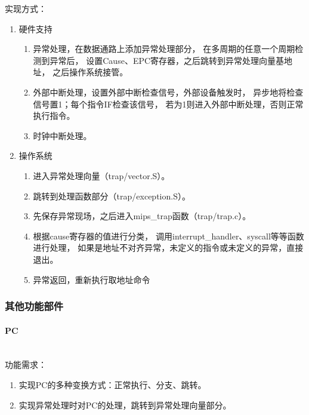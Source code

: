            实现方式：
            \begin{enumerate}
            \item
            硬件支持
                \begin{enumerate}
                \item
                异常处理，在数据通路上添加异常处理部分，%
                在多周期的任意一个周期检测到异常后，%
                设置Cause、EPC寄存器，之后跳转到异常处理向量基地址，%
                之后操作系统接管。
                \item
                外部中断处理，设置外部中断检查信号，外部设备触发时，%
                异步地将检查信号置1；每个指令IF检查该信号，%
                若为1则进入外部中断处理，否则正常执行指令。
                \item
                时钟中断处理。
                \end{enumerate}
            \item
            操作系统
                \begin{enumerate}
                \item
                进入异常处理向量（trap/vector.S）。
                \item
                跳转到处理函数部分（trap/exception.S）。
                \item
                先保存异常现场，之后进入mips\_trap函数（trap/trap.c）。
                \item
                根据cause寄存器的值进行分类，%
                调用interrupt\_handler、syscall等等函数进行处理，%
                如果是地址不对齐异常，未定义的指令或未定义的异常，直接退出。
                \item
                异常返回，重新执行取地址命令
                \end{enumerate}
            \end{enumerate}
        \subsubsection{其他功能部件}
            \paragraph{PC}
                \mbox{} \\ 

                功能需求：
                \begin{enumerate}
                \item
                实现PC的多种变换方式：正常执行、分支、跳转。
                \item
                实现异常处理时对PC的处理，跳转到异常处理向量部分。
                \end{enumerate}

